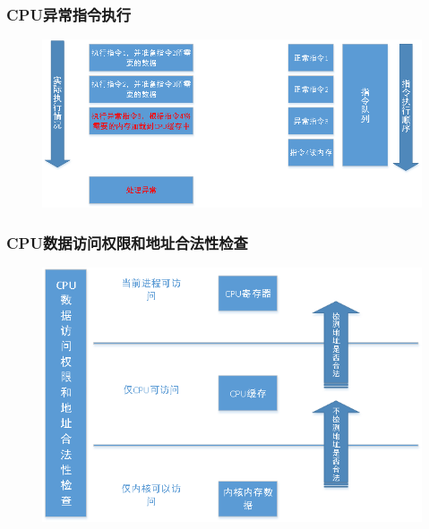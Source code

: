 % 
% 
% 
% 
% 
\begin{frame}
    \frametitle{CPU异常指令执行}
  	\begin{figure}
  	\includegraphics[width=0.9\linewidth]{figs/exception.png}
  	\end{figure}

\end{frame}
% 
% 
% 
\begin{frame}
    \frametitle{CPU数据访问权限和地址合法性检查}
  	\begin{figure}
  	\includegraphics[width=0.65\linewidth]{figs/right-check.png}
  	\end{figure}

\end{frame}
% 
% 
% 
